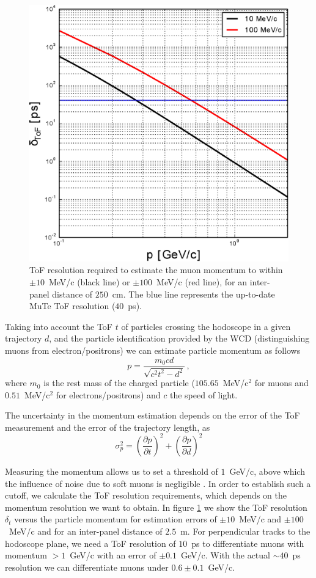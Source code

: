 \documentclass[letterpaper,11pt]{article}
\begin{document}
\begin{figure}[htb]
\centering
\includegraphics[width=0.5\columnwidth]{Figures/ToF_Resolution_250cm.eps}
\caption{ToF resolution required to estimate the muon momentum to within $\pm 10$~MeV/c (black line) or $\pm 100$~MeV/c (red line), for an inter-panel distance of $250$~cm. The blue line represents the up-to-date MuTe ToF resolution ($40$~ps).}
\label{fig:ToF_Resolution}
\end{figure}

Taking into account the ToF $t$ of particles crossing the hodoscope in a given trajectory $d$, and the particle identification provided by the WCD (distinguishing muons from electron/positrons) we can estimate particle momentum as follows
\begin{equation}
p = \frac{m_0 c d}{\sqrt{c^2t^2-d^2}} \, ,
\end{equation}
where $m_0$ is the rest mass of the charged particle ($ 105.65$~MeV/c$^2$ for muons and $0.51$~MeV/c$^2$ for electrons/positrons) and $c$ the speed of light. 

The uncertainty in the momentum estimation depends on the error of the ToF measurement and the error of the trajectory length, as
\begin{equation}
\sigma_p^2 = \left( \frac{\partial p}{\partial t} \right)^2 + \left( \frac{\partial p}{\partial d} \right)^2
\end{equation}

Measuring the momentum allows us to set a threshold of $1$~GeV/c, above which the influence of noise due to soft muons is negligible \cite{nishiyama2016monte, nishiyama2014experimental, Olh2018, Olh2017, ambrosino2015joint}. In order to establish such a cutoff, we calculate the ToF resolution requirements, which depends on the momentum resolution we want to obtain. In figure \ref{fig:ToF_Resolution} we show the ToF resolution $\delta_t$ versus the particle momentum for estimation errors of $\pm 10$~MeV/c and $\pm 100$~MeV/c and for an inter-panel distance of $2.5$~m. For perpendicular tracks to the hodoscope plane, we need a ToF resolution of $10$~ps to differentiate muons with momentum $> 1$~GeV/c with an error of $\pm 0.1$~GeV/c. With the actual $\sim 40$~ps resolution we can differentiate muons under $0.6\pm 0.1$~GeV/c.
\end{document}
